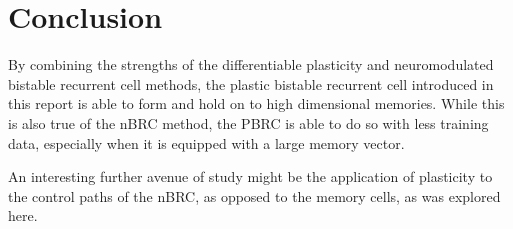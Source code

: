 \section{Conclusion}

By combining the strengths of the differentiable plasticity and neuromodulated bistable recurrent cell methods, the plastic bistable recurrent cell introduced in this report is able to form and hold on to high dimensional memories. While this is also true of the nBRC method, the PBRC is able to do so with less training data, especially when it is equipped with a large memory vector.

An interesting further avenue of study might be the application of plasticity to the control paths of the nBRC, as opposed to the memory cells, as was explored here.